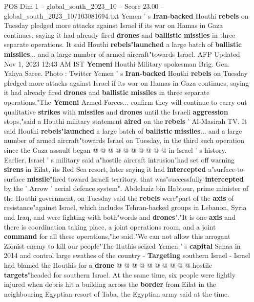 \begin{textsample}{POS Dim 1 – global\_south\_2023\_10 – Score 23.00 – global\_south\_2023\_10/103081694.txt}  \label{ex:f1_pos_053}
Yemen ' s \textbf{Iran-backed} Houthi \textbf{rebels} on Tuesday pledged more attacks against Israel if its war on Hamas in Gaza continues, saying it had already fired \textbf{drones} and \textbf{ballistic} \textbf{missiles} in three separate operations.
It said Houthi \textbf{rebels}"\textbf{launched} a large batch of \textbf{ballistic} \textbf{missiles}... and a large number of armed aircraft"towards Israel.
AFP Updated Nov 1, 2023 12:43 AM IST \textbf{Yemeni} Houthi Military spokesman Brig.
Gen.
Yahya Saree.
Photo : Twitter Yemen ' s \textbf{Iran-backed} Houthi \textbf{rebels} on Tuesday pledged more attacks against Israel if its war on Hamas in Gaza continues, saying it had already fired \textbf{drones} and \textbf{ballistic} \textbf{missiles} in three separate operations."The \textbf{Yemeni} Armed Forces... confirm they will continue to carry out qualitative \textbf{strikes} with \textbf{missiles} and \textbf{drones} until the Israeli \textbf{aggression} stops,"said a Houthi military statement \textbf{aired} on the \textbf{rebels} ' Al-Masirah TV.
It said Houthi \textbf{rebels}"\textbf{launched} a large batch of \textbf{ballistic} \textbf{missiles}... and a large number of armed aircraft"towards Israel on Tuesday, in the third such operation since the Gaza assault began @ @ @ @ @ @ @ @ @ @ in Israel ' s history.
Earlier, Israel ' s military said a"hostile aircraft intrusion"had set off warning \textbf{sirens} in Eilat, its Red Sea resort, later saying it had \textbf{intercepted} a"surface-to-surface \textbf{missile}"fired toward Israeli territory, that was"successfully \textbf{intercepted} by the ' Arrow ' aerial defence system".
Abdelaziz bin Habtour, prime minister of the Houthi government, on Tuesday said the \textbf{rebels} were"part of the \textbf{axis} of resistance"against Israel, which includes Tehran-backed groups in Lebanon, Syria and Iraq, and were fighting with both"words and \textbf{drones}"."It is one \textbf{axis} and there is coordination taking place, a joint operations room, and a joint \textbf{command} for all these operations,"he said."We can not allow this arrogant Zionist enemy to kill our people"The Huthis seized Yemen ' s \textbf{capital} Sanaa in 2014 and control large swathes of the country - \textbf{Targeting} southern Israel - Israel had blamed the Houthis for a \textbf{drone} @ @ @ @ @ @ @ @ @ @ hostile \textbf{targets}"headed for southern Israel.
At the same time, six people were lightly injured when debris hit a building across the \textbf{border} from Eilat in the neighbouring Egyptian resort of Taba, the Egyptian army said at the time.

\end{textsample}
